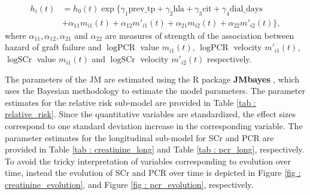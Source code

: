\begin{equation}
\label{eq : hazard_prias}
\begin{aligned}
h_i(t) &= h_0(t) \exp\big\{\gamma_1 \mbox{prev\_tp} + \gamma_2 \mbox{hla}  + \gamma_3 \mbox{cit} + \gamma_4 \mbox{dial\_days} \\
& + \alpha_{11} m_{i1}(t) + \alpha_{12} m'_{i1}(t) + \alpha_{21} m_{i2}(t) + \alpha_{22} m'_{i2}(t)\big\},
\end{aligned}
\end{equation}
where $\alpha_{11}, \alpha_{12}, \alpha_{21}$ and $\alpha_{22}$ are measures of strength of the association between hazard of graft failure and $\log \mbox{PCR}$ value $m_{i1}(t)$, $\log \mbox{PCR}$ velocity $m'_{i1}(t)$, $\log \mbox{SCr}$ value $m_{i1}(t)$ and $\log \mbox{SCr}$ velocity $m'_{i2}(t)$ respectively.

The parameters of the JM are estimated using the R package \textbf{JMbayes} \citep{rizopoulosJMbayes}, which uses the Bayesian methodology to estimate the model parameters. The parameter estimates for the relative risk sub-model are provided in Table \ref{tab : relative_risk}. Since the quantitative variables are standardized, the effect sizes correspond to one standard deviation increase in the corresponding variable.  The parameter estimates for the longitudinal sub-model for SCr and PCR are provided in Table \ref{tab : creatinine_long} and Table \ref{tab : pcr_long}, respectively. To avoid the tricky interpretation of variables corresponding to evolution over time, instead the evolution of SCr and PCR over time is depicted in Figure \ref{fig : creatinine_evolution}, and Figure \ref{fig : pcr_evolution}, respectively.

